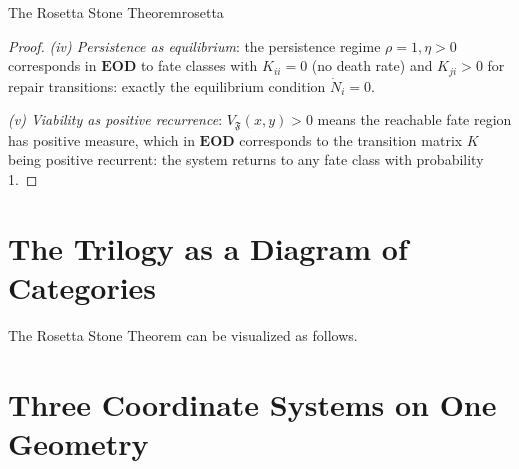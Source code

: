 \documentclass[12pt,twoside,openright]{book}
\newcommand{\fateMap}{\mathfrak{F}}
\newcommand{\survRatio}{\rho}             %
\newcommand{\repEff}{\eta}               %
\newcommand{\catFate}{\mathbf{Fate}}
\providecommand{\fateVol}[1]{V_{\fateMap}(#1)}
\providecommand{\catFate}{\mathbf{Fate}}
\providecommand{\transRate}{K}
\providecommand{\catPBT}{\mathbf{PBT}}
\providecommand{\catEOD}{\mathbf{EOD}}
\providecommand{\functorPBT}{\Phi_{\mathrm{PBT}}}
\providecommand{\functorEOD}{\Phi_{\mathrm{EOD}}}
\begin{document}
\begin{metatheorem}{The Rosetta Stone Theorem}{rosetta}
\begin{proof}
\emph{(iv) Persistence as equilibrium}: the persistence
regime $\survRatio=1,\repEff>0$ corresponds in
$\catEOD$ to fate classes with $K_{ii}=0$ (no death rate)
and $K_{ji}>0$ for repair transitions: exactly the
equilibrium condition $\dot{N}_i=0$.

\emph{(v) Viability as positive recurrence}: $\fateVol{x,y}
>0$ means the reachable fate region has positive measure,
which in $\catEOD$ corresponds to the transition matrix
$\transRate$ being positive recurrent: the system
returns to any fate class with probability 1.
\end{proof}
\end{metatheorem}

\section{The Trilogy as a Diagram of Categories}

The Rosetta Stone Theorem can be visualized as follows.

\begin{center}
\end{center}

\section{Three Coordinate Systems on One Geometry}
\end{document}
